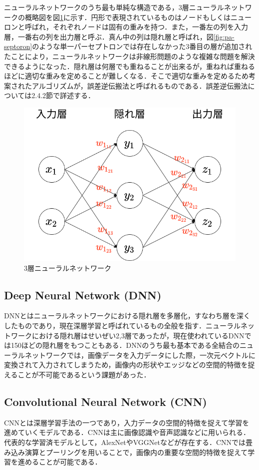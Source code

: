 \documentclass[a4j, 11pt]{jreport}
\begin{document}
ニューラルネットワークのうち最も単純な構造である，3層ニューラルネットワークの概略図を図\ref{fig:3nn}に示す．円形で表現されているものはノードもしくはニューロンと呼ばれ，それぞれノードは固有の重みを持つ．また，一番左の列を入力層，一番右の列を出力層と呼ぶ．真ん中の列は隠れ層と呼ばれ，図\ref{fig:pa-septoron}のような単一パーセプトロンでは存在しなかった3番目の層が追加されたことにより，ニューラルネットワークは非線形問題のような複雑な問題を解決できるようになった．隠れ層は何層でも重ねることが出来るが，重ねれば重ねるほどに適切な重みを定めることが難しくなる．そこで適切な重みを定めるため考案されたアルゴリズムが，誤差逆伝搬法と呼ばれるものである．誤差逆伝搬法については2.4.2節で詳述する．

\begin{figure}[H]
 \centering
 \includegraphics[width=0.7\hsize, keepaspectratio]{images/drawio/3nn.png}
 \caption{3層ニューラルネットワーク}
 \label{fig:3nn}
\end{figure}

\subsection{Deep Neural Network (DNN)}
DNNとはニューラルネットワークにおける隠れ層を多層化，すなわち層を深くしたものであり，現在深層学習と呼ばれているもの全般を指す．ニューラルネットワークにおける隠れ層はせいぜい2,3層であったが，現在使われているDNNでは150ほどの隠れ層をもつこともある．DNNのうち最も基本である全結合のニューラルネットワークでは，画像データを入力データにした際，一次元ベクトルに変換されて入力されてしまうため，画像内の形状やエッジなどの空間的特徴を捉えることが不可能であるという課題があった．

\subsection{Convolutional Neural Network (CNN)}
CNNとは深層学習手法の一つであり，入力データの空間的特徴を捉えて学習を進めていくモデルである．CNNは主に画像認識や音声認識などに用いられる．代表的な学習済モデルとして，AlexNet\cite{Krizhevsky2012}やVGGNet\cite{Simonyan2015}などが存在する．CNNでは畳み込み演算とプーリングを用いることで，画像内の重要な空間的特徴を捉えて学習を進めることが可能である．
\end{document}
